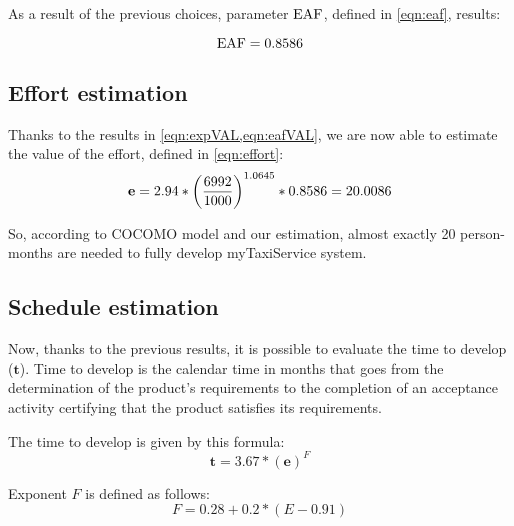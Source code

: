 \clearpage



As a result of the previous choices, parameter $ \text{EAF} $, defined in \cref{eqn:eaf}, results:

\begin{equation}
	\text{EAF}  = 0.8586	 \label{eqn:eafVAL}
\end{equation}





\subsection*{Effort estimation}

Thanks to the results in \cref{eqn:expVAL,eqn:eafVAL}, we are now able to estimate the value of the effort, defined in \cref{eqn:effort}:
\begin{equation}
%
	\mEffort = 2.94 * { \left( \frac{6992}{1000} \right) }^{1.0645} * 0.8586 = 20.0086
%
\end{equation}

So, according to COCOMO model and our estimation, almost exactly 20 person-months are needed to fully develop myTaxiService system.








\subsection{Schedule estimation}

Now, thanks to the previous results, it is possible to evaluate the time to develop ($ \mathbf{t} $). Time to develop is the calendar time in months that goes from the determination of the product's requirements to the completion of an acceptance activity certifying that the product satisfies its requirements.

The time to develop is given by this formula:\begin{equation}%
%
\mathbf{t} = 3.67 * {\left(\mathbf{e}\right)}^F \label{eqn:ttdev}
%
\end{equation}


Exponent $ F $ is defined as follows:
\begin{equation}
	F = 0.28 + 0.2 * \left( E - 0.91 \right) \label{eqn:expF}
\end{equation}  


